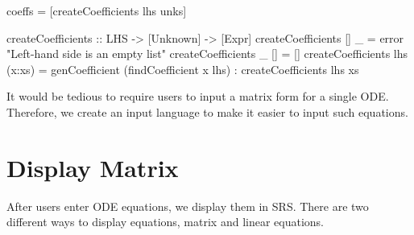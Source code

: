 \begin{haskell1}
coeffs = [createCoefficients lhs unks]

createCoefficients :: LHS -> [Unknown] -> [Expr]
createCoefficients [] _ = error "Left-hand side is an empty list"
createCoefficients _ [] = []
createCoefficients lhs (x:xs) = genCoefficient (findCoefficient x lhs) : createCoefficients lhs xs
\end{haskell1}

It would be tedious to require users to input a matrix form for a single ODE. Therefore, we create an input language to make it easier to input such equations.

\section{Display Matrix}
After users enter ODE equations, we display them in SRS. There are two different ways to display equations, matrix and linear equations.
